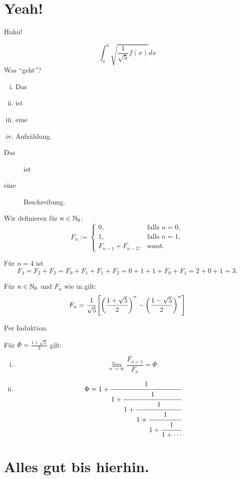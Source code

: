 \section{Yeah!}
Huhu! 

\[
	\int_{a}^{b} \sqrt{\frac{1}{\sqrt{5}} f(x)} dx
\]
Was \enquote{geht}? 

\begin{enumerate}[(i)]
	\item Das
	\item ist 
	\item eine
	\item Aufzählung.
\end{enumerate}

\begin{description}
	\item[Das] ist
	\item[eine] Beschreibung.
\end{description}

\begin{definition}
	\label{def:fibonacci}
	Wir definieren für $n \in \mathbb{N}_0$:
	\[
		F_n := \begin{cases}
			0, & \text{falls } n = 0, \\
			1, & \text{falls } n = 1, \\
			F_{n-1} + F_{n-2}, & \text{sonst.}
		\end{cases}
	\]
\end{definition}

\begin{beispiel}
	Für $n = 4$ ist
	\[
		F_4 = F_2 + F_3 = F_0 + F_1 + F_1 + F_2 = 0 + 1 + 1 + F_0 + F_1 = 2 + 0 + 1 = 3.
	\]
\end{beispiel}

\begin{satz}
	Für $n \in \mathbb{N}_0$ und $F_n$ wie in   gilt:
	\[
		F_n = \frac{1}{\sqrt{5}} \benb{ \enb{\frac{1+\sqrt{5}}{2}}^n - \enb{\frac{1-\sqrt{5}}{2}}^n}
	\]
\end{satz}

\begin{beweis}
	Per Induktion.
\end{beweis}

\begin{korollar}
	Für $\Phi = \frac{1+\sqrt{5}}{2}$ gilt:
	\begin{enumerate}[(i)]
		\item \[
			\lim\limits_{n \rightarrow \infty} \frac{F_{n+1}}{F_n} = \Phi.
		\]
		\item \[
			\Phi = 1 + \cfrac{1}{1+ \cfrac{1}{1 + \cfrac{1}{1 + \cfrac{1}{1 + \cfrac{1}{1 + \cdots}}}}}
		\]
	\end{enumerate}
\end{korollar}
\lipsum

\section{Alles gut bis hierhin.}

